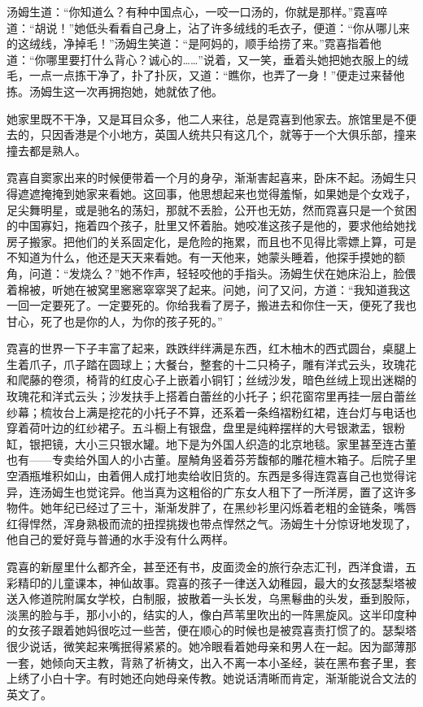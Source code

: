 \par 汤姆生道：“你知道么？有种中国点心，一咬一口汤的，你就是那样。”霓喜啐道：“胡说！”她低头看看自己身上，沾了许多绒线的毛衣子，便道：“你从哪儿来的这绒线，净掉毛！”汤姆生笑道：“是阿妈的，顺手给捞了来。”霓喜指着他道：“你哪里要打什么背心？诚心的……”说着，又一笑，垂着头她把她衣服上的绒毛，一点一点拣干净了，扑了扑灰，又道：“瞧你，也弄了一身！”便走过来替他拣。汤姆生这一次再拥抱她，她就依了他。
\par 她家里既不干净，又是耳目众多，他二人来往，总是霓喜到他家去。旅馆里是不便去的，只因香港是个小地方，英国人统共只有这几个，就等于一个大俱乐部，撞来撞去都是熟人。
\par 霓喜自窦家出来的时候便带着一个月的身孕，渐渐害起喜来，卧床不起。汤姆生只得遮遮掩掩到她家来看她。这回事，他思想起来也觉得羞惭，如果她是个女戏子，足尖舞明星，或是驰名的荡妇，那就不丢脸，公开也无妨，然而霓喜只是一个贫困的中国寡妇，拖着四个孩子，肚里又怀着胎。她咬准这孩子是他的，要求他给她找房子搬家。把他们的关系固定化，是危险的拖累，而且也不见得比零嫖上算，可是不知道为什么，他还是天天来看她。有一天他来，她蒙头睡着，他探手摸她的额角，问道：“发烧么？”她不作声，轻轻咬他的手指头。汤姆生伏在她床沿上，脸偎着棉被，听她在被窝里窸窸窣窣哭了起来。问她，问了又问，方道：“我知道我这一回一定要死了。一定要死的。你给我看了房子，搬进去和你住一天，便死了我也甘心，死了也是你的人，为你的孩子死的。”
\par 霓喜的世界一下子丰富了起来，跌跌绊绊满是东西，红木柚木的西式圆台，桌腿上生着爪子，爪子踏在圆球上；大餐台，整套的十二只椅子，雕有洋式云头，玫瑰花和爬藤的卷须，椅背的红皮心子上嵌着小铜钉；丝绒沙发，暗色丝绒上现出迷糊的玫瑰花和洋式云头；沙发扶手上搭着白蕾丝的小托子；织花窗帘里再挂一层白蕾丝纱幕；梳妆台上满是挖花的小托子不算，还系着一条绉褶粉红裙，连台灯与电话也穿着荷叶边的红纱裙子。五斗橱上有银盘，盘里是纯粹摆样的大号银漱盂，银粉缸，银把镜，大小三只银水罐。地下是为外国人织造的北京地毯。家里甚至连古董也有——专卖给外国人的小古董。屋觭角竖着芬芳馥郁的雕花檀木箱子。后院子里空酒瓶堆积如山，由着佣人成打地卖给收旧货的。东西是多得连霓喜自己也觉得诧异，连汤姆生也觉诧异。他当真为这粗俗的广东女人租下了一所洋房，置了这许多物件。她年纪已经过了三十，渐渐发胖了，在黑纱衫里闪烁着老粗的金链条，嘴唇红得悍然，浑身熟极而流的扭捏挑拨也带点悍然之气。汤姆生十分惊讶地发现了，他自己的爱好竟与普通的水手没有什么两样。
\par 霓喜的新屋里什么都齐全，甚至还有书，皮面烫金的旅行杂志汇刊，西洋食谱，五彩精印的儿童课本，神仙故事。霓喜的孩子一律送入幼稚园，最大的女孩瑟梨塔被送入修道院附属女学校，白制服，披散着一头长发，乌黑鬈曲的头发，垂到股际，淡黑的脸与手，那小小的，结实的人，像白芦苇里吹出的一阵黑旋风。这半印度种的女孩子跟着她妈很吃过一些苦，便在顺心的时候也是被霓喜责打惯了的。瑟梨塔很少说话，微笑起来嘴抿得紧紧的。她冷眼看着她母亲和男人在一起。因为鄙薄那一套，她倾向天主教，背熟了祈祷文，出入不离一本小圣经，装在黑布套子里，套上绣了小白十字。有时她还向她母亲传教。她说话清晰而肯定，渐渐能说合文法的英文了。

